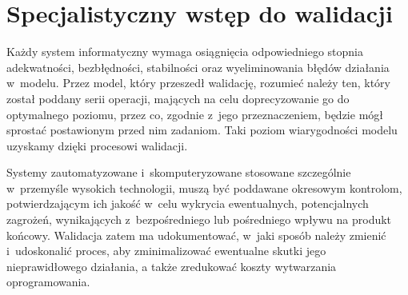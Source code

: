 \documentclass[openright]{xmgr}
\begin{document}

\section{Specjalistyczny wstęp do walidacji}

\indent \indent \indent Każdy system informatyczny wymaga osiągnięcia odpowiedniego stopnia adekwatności, bezbłędności, stabilności oraz wyeliminowania błędów działania w~modelu. Przez model, który przeszedł walidację, rozumieć należy ten, który został poddany serii operacji, mających na celu doprecyzowanie go do optymalnego poziomu, przez co, zgodnie z~jego przeznaczeniem, będzie mógł sprostać postawionym przed nim zadaniom. Taki poziom wiarygodności modelu uzyskamy dzięki procesowi walidacji.

Systemy zautomatyzowane i~skomputeryzowane stosowane szczególnie w~przemyśle wysokich technologii, muszą być poddawane okresowym kontrolom, potwierdzającym ich jakość w~celu wykrycia ewentualnych, potencjalnych zagrożeń, wynikających z~bezpośredniego lub pośredniego wpływu na produkt końcowy. Walidacja zatem ma udokumentować, w~jaki sposób należy zmienić i~udoskonalić proces, aby zminimalizować ewentualne skutki jego nieprawidłowego działania, a także zredukować koszty wytwarzania oprogramowania.\cite{Validation}\cite{ekonomia}\cite{Categories}\cite{LAB-EL2}
\end{document}
